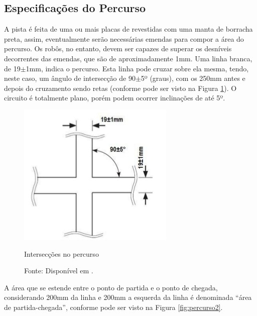 \vspace{1cm}
\subsection{Especificações do Percurso} \label{cap:perc_robocore}

A pista é feita de uma ou mais placas de  revestidas com uma manta de 
borracha preta, assim, eventualmente serão necessárias emendas para compor a área do percurso. Os robôs, no entanto, 
devem ser capazes de superar os desníveis decorrentes das emendas, que são de aproximadamente 1mm.
Uma linha branca, de 19$\pm$1mm, indica o percurso. Esta linha pode cruzar sobre ela mesma, tendo, neste caso, 
um ângulo de intersecção de 90$\pm$5º (graus), com os 250mm antes e depois do cruzamento sendo retas (conforme pode 
ser visto na Figura \ref{fig:percurso1}). O circuito é totalmente plano, porém podem ocorrer 
inclinações de até 5º.\par



\begin{figure}[h!]
 \centering
 \captionsetup{width=0.37\textwidth,font=footnotesize,textfont=bf}
 \includegraphics[scale=0.6]{figuras/Percurso1.png}
 \caption{Intersecções no percurso \label{fig:percurso1}}
 \vspace{-0.7cm}
 \caption*{Fonte: Disponível em \cite[p.4]{RegrasRobocore}.}
\end{figure}






A área que se estende entre o ponto de partida e o ponto de chegada, considerando 200mm da linha e 200mm a esquerda da linha
 é denominada ``área de partida-chegada'', conforme pode ser visto na Figura \ref{fig:percurso2}.\par

